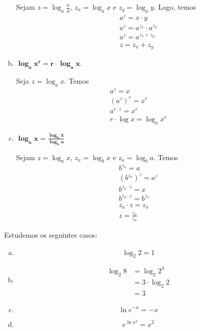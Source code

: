 \begin{enumerate}[a)]
  Sejam $z = \log_a \frac{x}{y}$, $z_x = \log_a x$ e $z_y = \log_a y$. Logo, temos
  \begin{gather}
    a^z = x\cdot y\\
    a^z = a^{z_x}\cdot a^{z_y}\\
    a^z = a^{z_x+z_y}\\
    z = z_x + z_y
  \end{gather}
\item $\displaystyle \pmb{\log_a x^r = r\cdot\log_a x}$.

  Seja $z = \log_a x$. Temos
  \begin{gather}
    a^{z} = x\\
    \left(a^z\right)^r = x^r\\
    a^{r\cdot z} = x^r\\
    r\cdot\log x = \log_a x^r
  \end{gather}
\item $\displaystyle \pmb{\log_a x = \frac{\log_b x}{\log_b a}}$

  Sejam $z = \log_a x$, $z_x = \log_b x$ e $z_a = \log_b a$. Temos
  \begin{gather}
    b^{z_a} = a\\
    (b^{z_a})^{z} = a^z\\
    b^{z_a\cdot z} = x\\
    b^{z_a\cdot z} = b^{z_x}\\
    z_a\cdot z = z_x\\
    z = \frac{z_x}{z_a}
  \end{gather}
\end{enumerate}

\begin{ex}
  Estudemos os seguintes casos:
  \begin{enumerate}[a)]
  \item
    \begin{equation}
      \log_2 2 = 1
  \end{equation}
\item
  \begin{align}
    \log_2 8 &= \log_2 2^3\\
             &= 3\cdot \log_2 2\\
             &= 3
  \end{align}
\item
  \begin{equation}
    \ln e^{-x} = -x
  \end{equation}
\item
  \begin{equation}
    e^{\ln x^2} = x^2
  \end{equation}
  \end{enumerate}
\end{ex}

